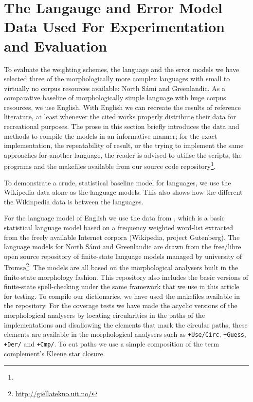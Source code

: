 \documentclass[a4paper,12pt]{article}
\begin{document}
\section{The Langauge and Error Model Data Used For Experimentation and
Evaluation}
\label{sec:material}

To evaluate the weighting schemes, the language and the error models we have
selected three of the morphologically more complex languages with small to
virtually no corpus resources available: North Sámi and Greenlandic.
As a comparative baseline of morphologically simple language with huge corpus
resources, we use English.  With English we can recreate the results of
reference literature, at least whenever the cited works properly distribute
their data for recreational purposes. The prose in this section briefly
introduces the data and methods to compile the models in an informative manner;
for the exact implementation, the repeatability of result, or the trying to
implement the same approaches for another language, the reader is advised to
utilise the scripts, the programs and the makefiles available from our source
code repository\footnote{}.

To demonstrate a crude, statistical baseline model for languages, we use the
Wikipedia data alone as the language models. This also shows how the different
the Wikinpedia data is between the languages.

For the language model of English we use the data from
\cite{norvig/2010,pirinen2012effects}, which is a basic statistical language
model based on a frequency weighted word-list extracted from the freely
available Internet corpora (Wikipedia, project Gutenberg).  The language models
for North Sámi and Greenlandic are drawn from the free/libre open
source repository of finite-state language models managed by university of
Tromsø\footnote{\url{http://giellatekno.uit.no/}}. The
models are all based on the morphological analysers built in the finite-state
morphology \cite[]{beesley2003finite} fashion. This repository also includes
the basic versions of finite-state spell-checking under the same framework that
we use in this article for testing. To compile our dictionaries, we have used
the makefiles available in the repository.  For the coverage tests we have made
the acyclic versions of the morphological analysers by locating circularities
in the paths of the implementations and disallowing the elements that mark the
circular paths, these elements are available in the morphological analysers
such as \texttt{+Use/Circ}, \texttt{+Guess}, \texttt{+Der/} and
\texttt{+Cmp/}. To cut paths we use a simple composition of the term
complement's Kleene star closure.
\end{document}

